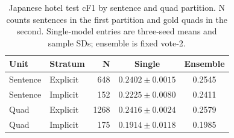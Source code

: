 \begin{table}[htbp]
\centering\small
\setlength{\tabcolsep}{3pt}
\caption{Japanese hotel test cF1 by sentence and quad partition. N counts sentences in the first partition and gold quads in the second. Single-model entries are three-seed means and sample SDs; ensemble is fixed vote-2.}\label{tab:implicit}
\begin{tabular}{llrcc}
\toprule
Unit & Stratum & N & Single & Ensemble \\
\midrule
Sentence & Explicit & 648 & $0.2402\pm0.0015$ & 0.2545 \\
Sentence & Implicit & 152 & $0.2225\pm0.0080$ & 0.2411 \\
Quad & Explicit & 1268 & $0.2416\pm0.0024$ & 0.2579 \\
Quad & Implicit & 175 & $0.1914\pm0.0118$ & 0.1985 \\
\bottomrule
\end{tabular}
\end{table}
